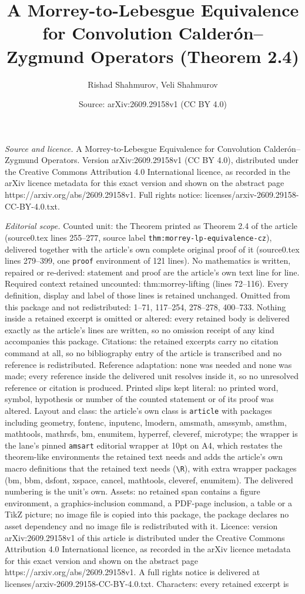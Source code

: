 \documentclass[10pt,a4paper]{amsart}
\title[A Morrey-to-Lebesgue Equivalence for Convolution Calder\'on-]{A Morrey-to-Lebesgue Equivalence for Convolution Calder\'on--Zygmund Operators (Theorem 2.4)}
\author{Rishad Shahmurov, Veli Shahmurov}
\date{Source: arXiv:2609.29158v1 (CC BY 4.0)}
\begin{document}
\maketitle

\noindent\emph{Source and licence.} A Morrey-to-Lebesgue Equivalence for Convolution Calder\'on--Zygmund Operators. Version arXiv:2609.29158v1 (CC BY 4.0), distributed under the Creative Commons Attribution 4.0 International licence, as recorded in the arXiv licence metadata for this exact version and shown on the abstract page https://arxiv.org/abs/2609.29158v1. Full rights notice: licenses/arxiv-2609.29158-CC-BY-4.0.txt.\par\smallskip

\noindent\textit{Editorial scope.} Counted unit: the Theorem printed as Theorem 2.4 of the article (source0.tex lines 255--277, source label \texttt{thm:morrey-lp-equivalence-cz}), delivered together with the article's own complete original proof of it (source0.tex lines 279--399, one \texttt{proof} environment of 121 lines). No mathematics is written, repaired or re-derived: statement and proof are the article's own text line for line. Required context retained uncounted: thm:morrey-lifting (lines 72--116). Every definition, display and label of those lines is retained unchanged. Omitted from this package and not redistributed: 1--71, 117--254, 278--278, 400--733. Nothing inside a retained excerpt is omitted or altered: every retained body is delivered exactly as the article's lines are written, so no omission receipt of any kind accompanies this package. Citations: the retained excerpts carry no citation command at all, so no bibliography entry of the article is transcribed and no reference is redistributed. Reference adaptation: none was needed and none was made; every reference inside the delivered unit resolves inside it, so no unresolved reference or citation is produced. Printed slips kept literal: no printed word, symbol, hypothesis or number of the counted statement or of its proof was altered. Layout and class: the article's own class is \texttt{article} with packages including geometry, fontenc, inputenc, lmodern, amsmath, amssymb, amsthm, mathtools, mathrsfs, bm, enumitem, hyperref, cleveref, microtype; the wrapper is the lane's pinned \texttt{amsart} editorial wrapper at 10pt on A4, which restates the theorem-like environments the retained text needs and adds the article's own macro definitions that the retained text needs (\texttt{\textbackslash R}), with extra wrapper packages (bm, bbm, dsfont, xspace, cancel, mathtools, cleveref, enumitem). The delivered numbering is the unit's own. Assets: no retained span contains a figure environment, a graphics-inclusion command, a PDF-page inclusion, a table or a TikZ picture; no image file is copied into this package, the package declares no asset dependency and no image file is redistributed with it. Licence: version arXiv:2609.29158v1 of this article is distributed under the Creative Commons Attribution 4.0 International licence, as recorded in the arXiv licence metadata for this exact version and shown on the abstract page https://arxiv.org/abs/2609.29158v1. A full rights notice is delivered at licenses/arxiv-2609.29158-CC-BY-4.0.txt. Characters: every retained excerpt is 
\end{document}

